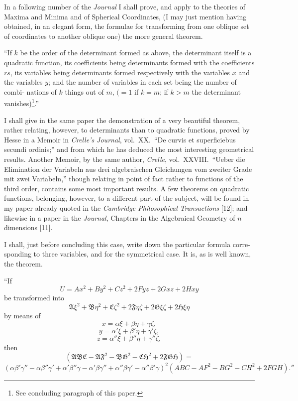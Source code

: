 \documentclass[11pt,a4paper]{article}
\theoremstyle{plain}
\theoremstyle{definition}
\theoremstyle{remark}
\begin{document}
\newpage

In a following number of the \textit{Journal} I shall prove, and apply to the theories of
Maxima and Minima and of Spherical Coordinates, (I may just mention having obtained,
in an elegant form, the formulae for transforming from one oblique set of coordinates
to another oblique one) the more general theorem.

``If $k$ be the order of the determinant formed as above, the determinant itself
is a quadratic function, its coefficients being determinants formed with the coefficients
$rs$, its variables being determinants formed respectively with the variables $x$ and the
variables $y$; and the number of variables in each set being the number of combi-
nations of $k$ things out of $m$, $(=1$ if $k=m$; if $k>m$ the determinant vanishes)\footnote{See concluding paragraph of this paper.}.''

I shall give in the same paper the demonstration of a very beautiful theorem,
rather relating, however, to determinants than to quadratic functions, proved by Hesse
in a Memoir in \textit{Crelle's Journal}, vol.\ XX.\ ``De curvis et superficiebus secundi ordinis;''
and from which he has deduced the most interesting geometrical results. Another
Memoir, by the same author, \textit{Crelle}, vol.\ XXVIII.\ ``Ueber die Elimination der Variabeln
aus drei algebraischen Gleichungen vom zweiter Grade mit zwei Variabeln,'' though
relating in point of fact rather to functions of the third order, contains some most
important results. A few theorems on quadratic functions, belonging, however, to a
different part of the subject, will be found in my paper already quoted in the \textit{Cambridge
Philosophical Transactions} [12]; and likewise in a paper in the \textit{Journal}, Chapters in
the Algebraical Geometry of $n$ dimensions [11].

I shall, just before concluding this case, write down the particular formula corre-
sponding to three variables, and for the symmetrical case. It is, as is well known, the
theorem.

``If
\[
U = Ax^2 + By^2 + Cz^2 + 2Fyz + 2Gxz + 2Hxy
\]
be transformed into
\[
\mathfrak{A}\xi^2 + \mathfrak{B}\eta^2 + \mathfrak{C}\zeta^2 + 2\mathfrak{F}\eta\zeta + 2\mathfrak{G}\xi\zeta + 2\mathfrak{H}\xi\eta
\]
by means of
\[
x = \alpha\xi + \beta\eta + \gamma\zeta,
\]
\[
y = \alpha'\xi + \beta'\eta + \gamma'\zeta,
\]
\[
z = \alpha''\xi + \beta''\eta + \gamma''\zeta,
\]
then
\[
(\mathfrak{A}\mathfrak{B}\mathfrak{C} - \mathfrak{A}\mathfrak{F}^2 - \mathfrak{B}\mathfrak{G}^2 - \mathfrak{C}\mathfrak{H}^2 + 2\mathfrak{F}\mathfrak{G}\mathfrak{H}) =
\]
\[
(\alpha\beta'\gamma'' - \alpha\beta''\gamma' + \alpha'\beta''\gamma - \alpha'\beta\gamma'' + \alpha''\beta\gamma' - \alpha''\beta'\gamma)^2
(ABC - AF^2 - BG^2 - CH^2 + 2FGH).''
\]
\end{document}

